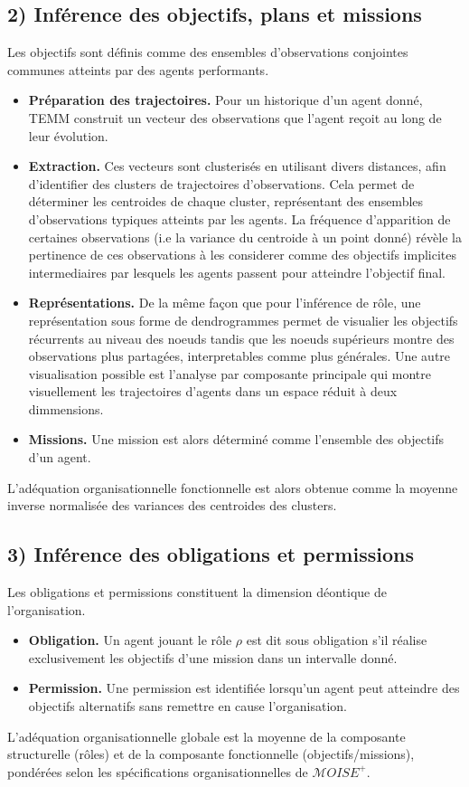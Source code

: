 \documentclass[francais,ROIA,Unicode,manuscript]{cedram}
\begin{document}
\subsection*{2) Inférence des objectifs, plans et missions}
Les objectifs sont définis comme des ensembles d’observations conjointes communes atteints par des agents performants.
\begin{itemize}
    \item \textbf{Préparation des trajectoires.} Pour un historique d'un agent donné, TEMM construit un vecteur des observations que l'agent reçoit au long de leur évolution.
    \item \textbf{Extraction.} Ces vecteurs sont clusterisés en utilisant divers distances, afin d’identifier des clusters de trajectoires d'observations. Cela permet de déterminer les centroides de chaque cluster, représentant des ensembles d’observations typiques atteints par les agents. La fréquence d'apparition de certaines observations (i.e la variance du centroide à un point donné) révèle la pertinence de ces observations à les considerer comme des objectifs implicites intermediaires par lesquels les agents passent pour atteindre l'objectif final.
    \item \textbf{Représentations.} De la même façon que pour l'inférence de rôle, une représentation sous forme de dendrogrammes permet de visualier les objectifs récurrents au niveau des noeuds tandis que les noeuds supérieurs montre des observations plus partagées, interpretables comme plus générales. Une autre visualisation possible est l'analyse par composante principale qui montre visuellement les trajectoires d'agents dans un espace réduit à deux dimmensions.
    \item \textbf{Missions.} Une mission est alors déterminé comme l'ensemble des objectifs d'un agent.
\end{itemize}
L’adéquation organisationnelle fonctionnelle est alors obtenue comme la moyenne inverse normalisée des variances des centroides des clusters.

\subsection*{3) Inférence des obligations et permissions}
Les obligations et permissions constituent la dimension déontique de l’organisation.
\begin{itemize}
    \item \textbf{Obligation.} Un agent jouant le rôle \(\rho\) est dit sous obligation s’il réalise exclusivement les objectifs d’une mission dans un intervalle donné.
    \item \textbf{Permission.} Une permission est identifiée lorsqu’un agent peut atteindre des objectifs alternatifs sans remettre en cause l’organisation.
\end{itemize}
L’adéquation organisationnelle globale est la moyenne de la composante structurelle (rôles) et de la composante fonctionnelle (objectifs/missions), pondérées selon les spécifications organisationnelles de \(\mathcal{M}OISE^+\).
\end{document}

